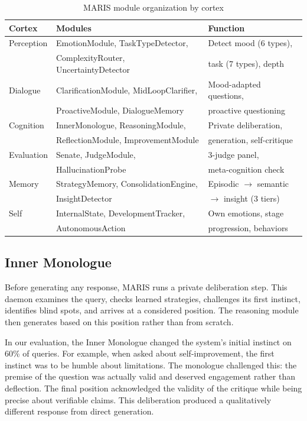 \documentclass[11pt,a4paper]{article}
\begin{document}
\begin{table}[H]
\centering
\caption{MARIS module organization by cortex}
\begin{tabular}{lll}
\toprule
\textbf{Cortex} & \textbf{Modules} & \textbf{Function} \\
\midrule
Perception & EmotionModule, TaskTypeDetector, & Detect mood (6 types), \\
           & ComplexityRouter, UncertaintyDetector & task (7 types), depth \\
\addlinespace
Dialogue & ClarificationModule, MidLoopClarifier, & Mood-adapted questions, \\
         & ProactiveModule, DialogueMemory & proactive questioning \\
\addlinespace
Cognition & InnerMonologue, ReasoningModule, & Private deliberation, \\
          & ReflectionModule, ImprovementModule & generation, self-critique \\
\addlinespace
Evaluation & Senate, JudgeModule, & 3-judge panel, \\
           & HallucinationProbe & meta-cognition check \\
\addlinespace
Memory & StrategyMemory, ConsolidationEngine, & Episodic $\rightarrow$ semantic \\
       & InsightDetector & $\rightarrow$ insight (3 tiers) \\
\addlinespace
Self & InternalState, DevelopmentTracker, & Own emotions, stage \\
     & AutonomousAction & progression, behaviors \\
\bottomrule
\end{tabular}
\end{table}

\subsection{Inner Monologue}

Before generating any response, MARIS runs a private deliberation step. This daemon examines the query, checks learned strategies, challenges its first instinct, identifies blind spots, and arrives at a considered position. The reasoning module then generates based on this position rather than from scratch.

In our evaluation, the Inner Monologue changed the system's initial instinct on 60\% of queries. For example, when asked about self-improvement, the first instinct was to be humble about limitations. The monologue challenged this: the premise of the question was actually valid and deserved engagement rather than deflection. The final position acknowledged the validity of the critique while being precise about verifiable claims. This deliberation produced a qualitatively different response from direct generation.
\end{document}

